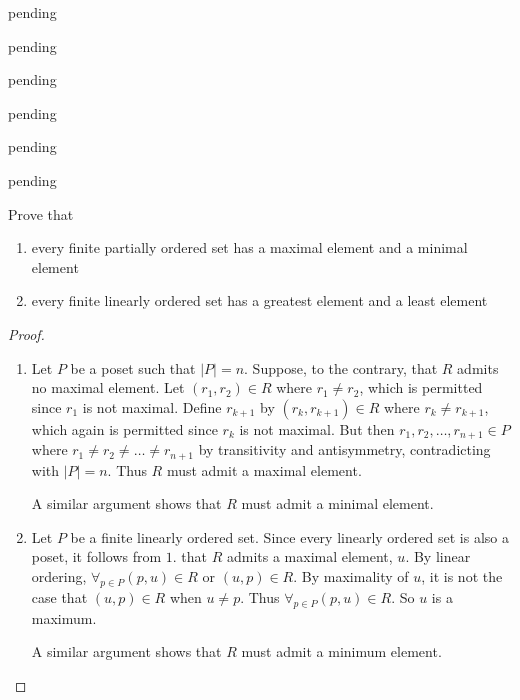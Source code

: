 \begin{exercise} \label{0.78}
	pending
\end{exercise}

\begin{exercise} \label{0.79}
	pending
\end{exercise}

\begin{exercise} \label{0.80}
	pending
\end{exercise}

\begin{exercise} \label{0.81}
	pending
\end{exercise}

\begin{exercise} \label{0.82}
	pending
\end{exercise}

\begin{exercise} \label{0.83}
	pending
\end{exercise}

\begin{exercise} \label{0.84}
	Prove that
	\begin{enumerate}
	    \item every finite partially ordered set has a maximal element and a minimal element
	    
	    \item every finite linearly ordered set has a greatest element and a least element
	\end{enumerate}
	
	\begin{proof}
	    \begin{enumerate}
	        \item Let \( P \) be a poset such that \( \vert P \vert = n \). Suppose, to the contrary, that \( R \) admits no maximal element. Let \( (r_1,r_2) \in R \) where \( r_1 \neq r_2 \), which is permitted since \( r_1 \) is not maximal. Define \( r_{k+1} \) by \( (r_k,r_{k+1}) \in R \) where \( r_k \neq r_{k+1} \), which again is permitted since \( r_k \) is not maximal. But then \( r_1, r_2, \ldots, r_{n+1} \in P \) where \( r_1 \neq r_2 \neq \ldots \neq r_{n+1} \) by transitivity and antisymmetry, contradicting with \( \vert P \vert = n \). Thus \( R \) must admit a maximal element.
	        
	        A similar argument shows that \( R \) must admit a minimal element.
	        
	        \item Let \( P \) be a finite linearly ordered set. Since every linearly ordered set is also a poset, it follows from \( 1. \) that \( R \) admits a maximal element, \( u \). By linear ordering, \( \forall_{p \in P} (p,u) \in R\) or \( (u,p) \in R \). By maximality of \( u \), it is not the case that \( (u,p) \in R \) when \( u \neq p \). Thus \( \forall_{p \in P} (p,u) \in R \). So \( u \) is a maximum.
	        
	        A similar argument shows that \( R \) must admit a minimum element.
	    \end{enumerate}
	\end{proof}
\end{exercise}

